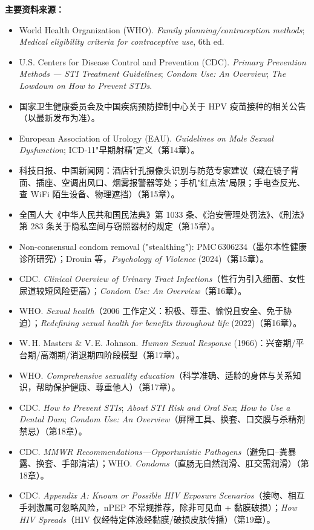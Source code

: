 \noindent\textbf{主要资料来源：}
\begin{itemize}[leftmargin=2em]
  \item World Health Organization (WHO). \emph{Family planning/contraception methods}; \emph{Medical eligibility criteria for contraceptive use}, 6th ed.
  \item U.S. Centers for Disease Control and Prevention (CDC). \emph{Primary Prevention Methods — STI Treatment Guidelines}; \emph{Condom Use: An Overview}; \emph{The Lowdown on How to Prevent STDs}.
  \item 国家卫生健康委员会及中国疾病预防控制中心关于 HPV 疫苗接种的相关公告（以最新发布为准）。
  \item European Association of Urology (EAU). \emph{Guidelines on Male Sexual Dysfunction}; ICD-11"早期射精"定义（第14章）。
  \item 科技日报、中国新闻网：酒店针孔摄像头识别与防范专家建议（藏在镜子背面、插座、空调出风口、烟雾报警器等处；手机"红点法"局限；手电查反光、查 WiFi 陌生设备、物理遮挡）（第15章）。
  \item 全国人大《中华人民共和国民法典》第 1033 条、《治安管理处罚法》、《刑法》第 283 条关于隐私空间与窃照器材的规定（第15章）。
  \item Non-consensual condom removal ("stealthing"): PMC\,6306234（墨尔本性健康诊所研究）；Drouin 等，\emph{Psychology of Violence} (2024)（第15章）。
  \item CDC. \emph{Clinical Overview of Urinary Tract Infections}（性行为引入细菌、女性尿道较短风险更高）；\emph{Condom Use: An Overview}（第16章）。
  \item WHO. \emph{Sexual health}（2006 工作定义：积极、尊重、愉悦且安全、免于胁迫）；\emph{Redefining sexual health for benefits throughout life} (2022)（第16章）。
  \item W.\,H. Masters \& V.\,E. Johnson. \emph{Human Sexual Response} (1966)：兴奋期/平台期/高潮期/消退期四阶段模型（第17章）。
  \item WHO. \emph{Comprehensive sexuality education}（科学准确、适龄的身体与关系知识，帮助保护健康、尊重他人）（第17章）。
  \item CDC. \emph{How to Prevent STIs}; \emph{About STI Risk and Oral Sex}; \emph{How to Use a Dental Dam}; \emph{Condom Use: An Overview}（屏障工具、换套、口交膜与杀精剂禁忌）（第18章）。
  \item CDC. \emph{MMWR Recommendations—Opportunistic Pathogens}（避免口--粪暴露、换套、手部清洁）；WHO. \emph{Condoms}（直肠无自然润滑、肛交需润滑）（第18章）。
  \item CDC. \emph{Appendix A: Known or Possible HIV Exposure Scenarios}（接吻、相互手刺激属可忽略风险，nPEP 不常规推荐，除非可见血 + 黏膜破损）；\emph{How HIV Spreads}（HIV 仅经特定体液经黏膜/破损皮肤传播）（第19章）。

\end{itemize}
